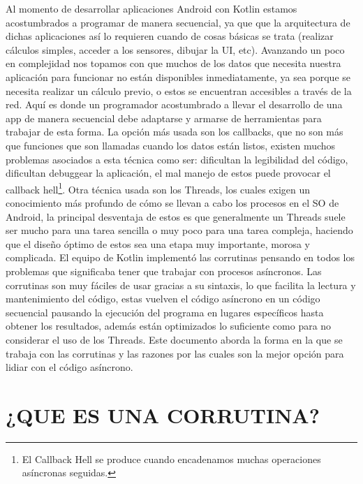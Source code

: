 \documentclass[twocolumn,10pt,abstract=on]{asme2ej}
\begin{document}
Al momento de desarrollar aplicaciones Android con Kotlin estamos acostumbrados a programar de manera secuencial, ya que que la arquitectura de dichas aplicaciones así lo requieren cuando de cosas básicas se trata (realizar cálculos simples, acceder a los sensores, dibujar la UI, etc). Avanzando un poco en complejidad nos topamos con que muchos de los datos que necesita nuestra aplicación para funcionar no están disponibles inmediatamente, ya sea porque se necesita realizar un cálculo previo, o estos se encuentran accesibles a través de la red. \linebreak\linebreak
Aquí es donde un programador acostumbrado a llevar el desarrollo de una app de manera secuencial debe adaptarse y armarse de herramientas para trabajar de esta forma. La opción más usada son los callbacks, que no son más que funciones que son llamadas cuando los datos están listos, existen muchos problemas asociados a esta técnica como ser: dificultan la legibilidad del código, dificultan debuggear la aplicación, el mal manejo de estos puede provocar el callback hell\footnote{El Callback Hell se produce cuando encadenamos muchas operaciones asíncronas seguidas.}.\linebreak\linebreak
Otra técnica usada son los Threads, los cuales exigen un conocimiento más profundo de cómo se llevan a cabo los procesos en el SO de Android, la principal desventaja de estos es que generalmente un Threads suele ser mucho para una tarea sencilla o muy poco para una tarea compleja, haciendo que el diseño óptimo de estos sea una etapa muy importante, morosa y complicada. El equipo de Kotlin implementó las corrutinas pensando en todos los problemas que significaba tener que trabajar con procesos asíncronos.\linebreak\linebreak
Las corrutinas son muy fáciles de usar gracias a su sintaxis, lo que facilita la lectura y mantenimiento del código, estas vuelven el código asíncrono en un código secuencial pausando la ejecución del programa en lugares específicos hasta obtener los resultados, además están optimizados lo suficiente como para no considerar el uso de los Threads.
Este documento aborda la forma en la que se trabaja con las corrutinas y las razones por las cuales son la mejor opción para lidiar con el código asíncrono.


\section{¿QUE ES UNA CORRUTINA?}
\end{document}
